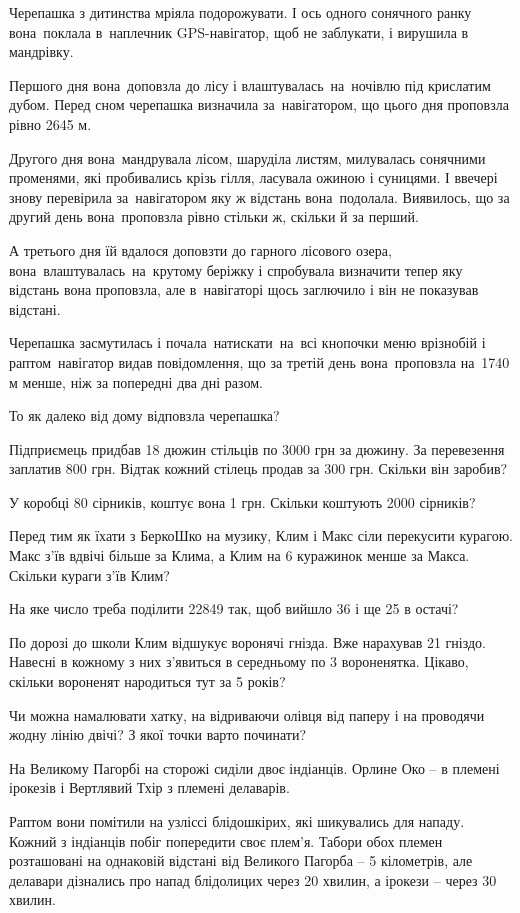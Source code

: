 \problem
Черепашка з дитинства мріяла подорожувати. І ось одного сонячного ранку
вона поклала в наплечник GPS-навігатор, щоб не заблукати,
і вирушила в мандрівку.

Першого дня вона доповзла до лісу і влаштувалась на ночівлю під крислатим
дубом. Перед сном черепашка визначила за навігатором, що цього дня
проповзла рівно 2645 м.

Другого дня вона мандрувала лісом, шаруділа листям, милувалась сонячними
променями, які пробивались крізь гілля, ласувала ожиною і суницями.
І ввечері знову перевірила за навігатором яку ж відстань вона подолала.
Виявилось, що за другий день вона проповзла рівно стільки ж,
скільки й за перший.

А третього дня їй вдалося доповзти до гарного лісового озера,
вона влаштувалась на крутому беріжку і спробувала визначити тепер
яку відстань вона проповзла, але в навігаторі щось заглючило
і він не показував відстані.

Черепашка засмутилась і почала натискати на всі кнопочки меню врізнобій
і раптом навігатор видав повідомлення, що за третій день вона проповзла
на 1740 м менше, ніж за попередні два дні разом.

То як далеко від дому відповзла черепашка?


\problem
Підприємець придбав 18 дюжин стільців по 3000 грн за дюжину.
За перевезення заплатив 800 грн.
Відтак кожний стілець продав за 300 грн.
Скільки він заробив?


\problem
У коробці 80 сірників, коштує вона 1 грн.
Скільки коштують 2000 сірників?


\problem
Перед тим як їхати з БеркоШко на музику, Клим і Макс сіли перекусити курагою.
Макс з’їв вдвічі більше за Клима, а Клим на 6 куражинок менше за Макса.
Скільки кураги з’їв Клим?


\problem
На яке число треба поділити 22849 так, щоб вийшло 36 і ще 25 в остачі?


\problem
По дорозі до школи Клим відшукує воронячі гнізда. Вже нарахував 21 гніздо.
Навесні в кожному з них з’явиться в середньому по 3 вороненятка.
Цікаво, скільки вороненят народиться тут за 5 років?


\problem
Чи можна намалювати хатку, на відриваючи олівця від паперу і на проводячи
жодну лінію двічі?
З якої точки варто починати?


\problem
На Великому Пагорбі на сторожі сиділи двоє індіанців.
Орлине Око – в племені ірокезів і Вертлявий Тхір з племені делаварів.

Раптом вони помітили на узліссі блідошкірих, які шикувались для нападу.
Кожний з індіанців побіг попередити своє плем’я.
Табори обох племен розташовані на однаковій відстані від Великого Пагорба –
5 кілометрів, але делавари дізнались про напад блідолицих через 20 хвилин,
а ірокези – через 30 хвилин.


